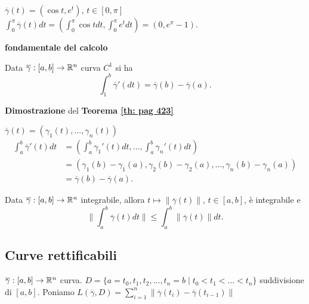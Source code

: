 \begin{exbar}
	$\overline{\gamma}(t)=(\cos t , e^t)$, $t \in [0,\pi]$\\
	$\int_{0}^\pi \overline{\gamma}(t)dt=\left( \int_0^\pi \cos t dt, \int_0^\pi e^t dt \right)=(0,e^\pi-1)$.
\end{exbar}


\begin{theorem} \textbf{fondamentale del calcolo}
	
	\label{th: pag 423}
	Data $\overline{\gamma}:[a,b]\rightarrow \mathbb{R}^n$ curva $C^1$ si ha
	\begin{equation*}
		\int_1^b\overline{\gamma}'(dt)=\overline{\gamma}(b)-\overline{\gamma}(a).
	\end{equation*}	
\end{theorem}


\begin{dembar}
	\textbf{Dimostrazione} del \textbf{Teorema \ref{th: pag 423}}
	
	$\overline{\gamma}(t)=(\gamma_1(t),...,\gamma_n(t))$\\
	\begin{align*}
		\int_a^b\overline{\gamma}'(t)dt&=\left( \int_a^b \gamma_1'(t)dt,...,\int_a^b \gamma_n'(t)dt \right)\\
		&=\left( \gamma_1(b)-\gamma_1(a),\gamma_2(b)-\gamma_2(a),...,\gamma_n(b)-\gamma_n(a)\right)\\
		&=\overline{\gamma}(b)-\overline{\gamma}(a).
	\end{align*}
\end{dembar}


\begin{theorem}
	Data $\overline{\gamma}: [a,b]\rightarrow \mathbb{R}^n$ integrabile, allora $t \mapsto \|\overline{\gamma}(t)\|$, $t\in[a,b]$, è integrabile e 
	\begin{equation*}
		\|\int_a^b\overline{\gamma}(t)dt\|\leq \int_a^b\|\overline{\gamma}(t)\|dt.
	\end{equation*}
\end{theorem}


\subsection{Curve rettificabili}

$\overline{\gamma}:[a,b]\rightarrow\mathbb{R}^n$ curva. $D=\{a=t_0,t_1,t_2,...,t_n=b\mid t_0<t_1<...<t_n\}$ suddivisione di $[a,b]$. Poniamo $L(\overline{\gamma},D)=\sum_{i=1}^{n}\| \overline{\gamma}(t_i)-\overline{\gamma}(t_{i-1}) \|$

